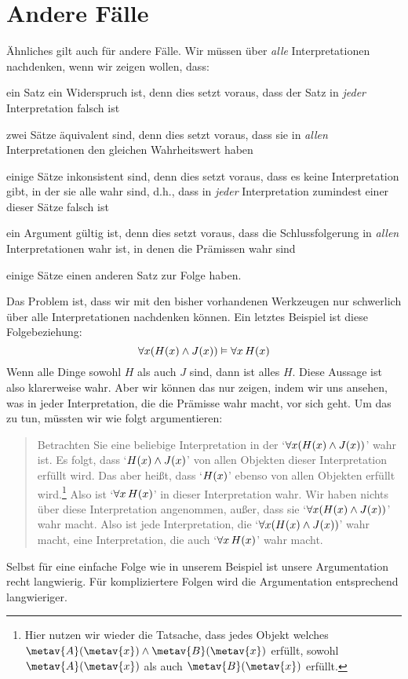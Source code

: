 \section{Andere Fälle}
Ähnliches gilt auch für andere Fälle. Wir müssen über \emph{alle} Interpretationen nachdenken, wenn wir zeigen wollen, dass:
	\begin{ebullet}
		\item ein Satz ein Widerspruch ist, denn dies setzt voraus, dass der Satz in \emph{jeder} Interpretation falsch ist
		\item zwei Sätze äquivalent sind, denn dies setzt voraus, dass sie in \emph{allen} Interpretationen den gleichen Wahrheitswert haben
		\item einige Sätze inkonsistent sind, denn dies setzt voraus, dass es keine Interpretation gibt, in der sie alle wahr sind, d.h.\@, dass in \emph{jeder} Interpretation zumindest einer dieser Sätze falsch ist
		\item ein Argument gültig ist, denn dies setzt voraus, dass die Schlussfolgerung in \emph{allen} Interpretationen wahr ist, in denen die Prämissen wahr sind
		\item einige Sätze einen anderen Satz zur Folge haben.
	\end{ebullet}
Das Problem ist, dass wir mit den bisher vorhandenen Werkzeugen nur schwerlich über alle Interpretationen nachdenken können. Ein letztes Beispiel ist diese Folgebeziehung:
	$$\forall x(\mathord{H}(x) \wedge \mathord{J}(x)) \vDash \forall x\, \mathord{H}(x)$$
Wenn alle Dinge sowohl $H$ als auch $J$ sind, dann ist alles $H$. Diese Aussage ist also klarerweise wahr. Aber wir können das nur zeigen, indem wir uns ansehen, was in jeder Interpretation, die die Prämisse wahr macht, vor sich geht. Um das zu tun, müssten wir wie folgt argumentieren:
	\begin{quote}
		Betrachten Sie eine beliebige Interpretation in der `$\forall x(\mathord{H}(x) \wedge \mathord{J}(x))$' wahr ist. Es folgt, dass `$\mathord{H}(x) \wedge \mathord{J}(x)$' von allen Objekten dieser Interpretation erfüllt wird. Das aber hei{\ss}t, dass `$\mathord{H}(x)$' ebenso von allen Objekten erfüllt wird.\footnote{Hier nutzen wir wieder die Tatsache, dass jedes Objekt welches $\metav{A}(\metav{x}) \land \metav{B}(\metav{x})$ erfüllt, sowohl $\metav{A}(\metav{x})$ als auch $\metav{B}(\metav{x})$ erfüllt.} Also ist `$\forall x\, \mathord{H}(x)$' in dieser Interpretation wahr. Wir haben nichts über diese Interpretation angenommen, au{\ss}er, dass sie `$\forall x(\mathord{H}(x) \wedge \mathord{J}(x))$' wahr macht. Also ist jede Interpretation, die `$\forall x(\mathord{H}(x) \wedge \mathord{J}(x))$' wahr macht, eine Interpretation, die auch `$\forall x\, \mathord{H}(x)$' wahr macht.
\end{quote}
Selbst für eine einfache Folge wie in unserem Beispiel ist unsere Argumentation recht langwierig. Für kompliziertere Folgen wird die Argumentation entsprechend langwieriger.


